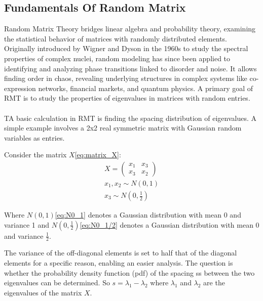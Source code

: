 \subsection{Fundamentals Of Random Matrix}\label{subsec:fundamentals-of-random-matrix}

Random Matrix Theory bridges linear algebra and probability theory\cite{vivo_random_2017}, examining the statistical behavior of matrices with randomly distributed elements.
Originally introduced by Wigner and Dyson in the 1960s to study the spectral properties of complex nuclei\cite{luo_constructing_2007}, random modeling has since been applied to identifying and analyzing phase transitions linked to disorder and noise\cite{deng_molecular_2012}.
It allows finding order in chaos, revealing underlying structures in complex systems like co-expression networks\cite{luo_constructing_2007}, financial markets\cite{pharasi_complex_2018}, and quantum physics\cite{guhr_random_1997}.
A primary goal of RMT is to study the properties of eigenvalues in matrices with random entries.
\\\\
\noindent TA basic calculation in RMT is finding the spacing distribution of eigenvalues.
A simple example involves a 2x2 real symmetric matrix with Gaussian random variables as entries.

\noindent Consider the matrix $X$\eqref{eq:matrix_X}:
\begin{align}
\label{eq:matrix_X}
X=\begin{pmatrix}
x_1 & x_3\\ x_3 & x_2
\end{pmatrix}\\
\label{eq:N0_1}
x_1, x_2 \sim N(0,1)\\
\label{eq:N0_1/2}
x_3 \sim N(0,\frac{1}{2})
\end{align}


\noindent Where $N(0,1)$\eqref{eq:N0_1} denotes a Gaussian distribution with mean 0 and variance 1 and $N(0,\frac{1}{2})$\eqref{eq:N0_1/2} denotes a Gaussian distribution with mean 0 and variance $\frac{1}{2}$.

The variance of the off-diagonal elements is set to half that of the diagonal elements for a specific reason, enabling an easier analysis.
The question is whether the probability density function (pdf) of the spacing ss between the two eigenvalues can be determined.
So $s=\lambda_1-\lambda_2$ where $\lambda_1$ and $\lambda_2$ are the eigenvalues of the matrix $X$.

